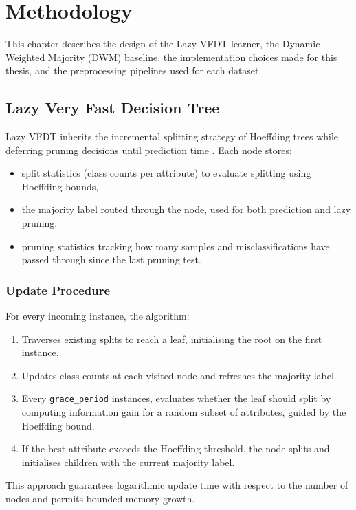 \cleardoublepage
\chapter{Methodology}
\label{chap:methodology}

This chapter describes the design of the Lazy VFDT learner, the Dynamic Weighted Majority (DWM) baseline, the implementation choices made for this thesis, and the preprocessing pipelines used for each dataset.

\section{Lazy Very Fast Decision Tree}
Lazy VFDT inherits the incremental splitting strategy of Hoeffding trees while deferring pruning decisions until prediction time \cite{domingos2000vfdt}.  Each node stores:
\begin{itemize}
    \item split statistics (class counts per attribute) to evaluate splitting using Hoeffding bounds,
    \item the majority label routed through the node, used for both prediction and lazy pruning,
    \item pruning statistics tracking how many samples and misclassifications have passed through since the last pruning test.
\end{itemize}

\subsection{Update Procedure}
For every incoming instance, the algorithm:
\begin{enumerate}
    \item Traverses existing splits to reach a leaf, initialising the root on the first instance.
    \item Updates class counts at each visited node and refreshes the majority label.
    \item Every \texttt{grace\_period} instances, evaluates whether the leaf should split by computing information gain for a random subset of attributes, guided by the Hoeffding bound.
    \item If the best attribute exceeds the Hoeffding threshold, the node splits and initialises children with the current majority label.
\end{enumerate}
This approach guarantees logarithmic update time with respect to the number of nodes and permits bounded memory growth.

